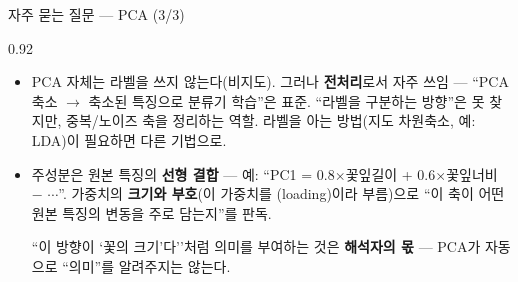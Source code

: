 \begin{frame}{자주 묻는 질문 --- PCA (3/3)}
\begin{center}\begin{varwidth}{0.92\textwidth}
  \small
  \begin{itemize}
    \item {}
      PCA 자체는 라벨을 쓰지 않는다(비지도). 그러나 \textbf{전처리}로서
      자주 쓰임 --- ``PCA 축소 $\to$ 축소된 특징으로 분류기 학습''은
      표준. \; ``라벨을 구분하는 방향''은 못 찾지만, 중복/노이즈 축을
      정리하는 역할. \; 라벨을 아는 방법(지도 차원축소, 예: LDA)이
      필요하면 다른 기법으로.
    \item {}
      주성분은 원본 특징의 \textbf{선형 결합} --- 예:
      ``PC1 = 0.8$\times$꽃잎길이 + 0.6$\times$꽃잎너비 $-$ $\cdots$''.
      \; 가중치의 \textbf{크기와 부호}(이 가중치를 (loading)이라
      부름)으로 ``이 축이 어떤 원본 특징의 변동을 주로 담는지''를 판독.
      \par ``이 방향이 `꽃의 크기'다''처럼 의미를 부여하는 것은
      \textbf{해석자의 몫} --- PCA가 자동으로 ``의미''를 알려주지는
      않는다.
  \end{itemize}
\end{varwidth}\end{center}
\end{frame}
